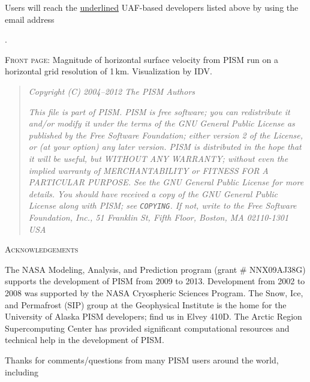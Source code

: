\documentclass[titlepage,letterpaper,final]{scrartcl}
\begin{document}
\bigskip\bigskip
Users will reach the \underline{underlined} UAF-based developers listed above by using the email address

\centerline{ \PISMEMAIL.  }

\bigskip\bigskip
\noindent \textsc{Front page}:  Magnitude of horizontal surface velocity from PISM run on a horizontal grid resolution of 1\,km.  Visualization by IDV.

\vfill

\newpage
\vspace{0.2in}
\begin{quote}
\textsl{Copyright (C) 2004--2012 The PISM Authors}
\medskip

\noindent \textsl{This file is part of PISM.  PISM is free software; you can redistribute it and/or modify it under the terms of the GNU General Public License as published by the Free Software Foundation; either version 2 of the License, or (at your option) any later version.  PISM is distributed in the hope that it will be useful, but WITHOUT ANY WARRANTY; without even the implied warranty of MERCHANTABILITY or FITNESS FOR A PARTICULAR PURPOSE.  See the GNU General Public License for more details.  You should have received a copy of the GNU General Public License along with PISM; see \emph{\texttt{COPYING}}.  If not, write to the Free Software Foundation, Inc., 51 Franklin St, Fifth Floor, Boston, MA  02110-1301 USA}
\end{quote}
\vspace{0.5in}

\centerline{\textsc{Acknowledgements}}
\bigskip

\small
The NASA Modeling, Analysis, and Prediction program (grant \# NNX09AJ38G) supports the development of PISM from 2009 to 2013.  Development from 2002 to 2008 was supported by the NASA Cryospheric Sciences Program.  The Snow, Ice, and Permafrost (SIP) group at the Geophysical Institute is the home for the University of Alaska PISM developers; find us in Elvey 410D.  The Arctic Region Supercomputing Center has provided significant computational resources and technical help in the development of PISM.

Thanks for comments/questions from many PISM users around the world, including
\end{document}
